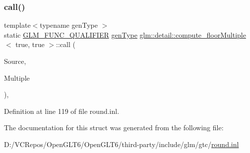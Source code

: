 \subsubsection{\texorpdfstring{call()}{call()}}
{\footnotesize\ttfamily template$<$typename gen\+Type $>$ \\
static \mbox{\hyperlink{setup_8hpp_a33fdea6f91c5f834105f7415e2a64407}{G\+L\+M\+\_\+\+F\+U\+N\+C\+\_\+\+Q\+U\+A\+L\+I\+F\+I\+ER}} \mbox{\hyperlink{structglm_1_1detail_1_1gen_type}{gen\+Type}} \mbox{\hyperlink{structglm_1_1detail_1_1compute__floor_multiple}{glm\+::detail\+::compute\+\_\+floor\+Multiple}}$<$ true, true $>$\+::call (\begin{DoxyParamCaption}\item[{\mbox{\hyperlink{structglm_1_1detail_1_1gen_type}{gen\+Type}}}]{Source,  }\item[{\mbox{\hyperlink{structglm_1_1detail_1_1gen_type}{gen\+Type}}}]{Multiple }\end{DoxyParamCaption})\hspace{0.3cm}{\ttfamily [inline]}, {\ttfamily [static]}}



Definition at line 119 of file round.\+inl.



The documentation for this struct was generated from the following file\+:\begin{DoxyCompactItemize}
\item 
D\+:/\+V\+C\+Repos/\+Open\+G\+L\+T6/\+Open\+G\+L\+T6/third-\/party/include/glm/gtc/\mbox{\hyperlink{round_8inl}{round.\+inl}}\end{DoxyCompactItemize}
